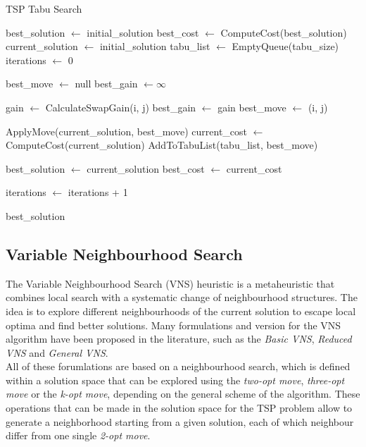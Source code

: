 \documentclass{article}
\begin{document}
\begin{algorithm}[!ht]
\caption{TSP Tabu Search}
\begin{algorithmic}[1]
\State best\_solution $\gets$ initial\_solution
\State best\_cost $\gets$ ComputeCost(best\_solution)
\State current\_solution $\gets$ initial\_solution
\State tabu\_list $\gets$ EmptyQueue(tabu\_size)
\State iterations $\gets$ 0

    \State best\_move $\gets$ null
    \State best\_gain $\gets \infty$
    
            \State gain $\gets$ CalculateSwapGain(i, j)
                \State best\_gain $\gets$ gain
                \State best\_move $\gets$ (i, j)
            \EndIf
        \EndIf
    \EndFor
    
    \State ApplyMove(current\_solution, best\_move)
    \State current\_cost $\gets$ ComputeCost(current\_solution)
    \State AddToTabuList(tabu\_list, best\_move)
    
        \State best\_solution $\gets$ current\_solution
        \State best\_cost $\gets$ current\_cost
    \EndIf
    
    \State iterations $\gets$ iterations + 1
\EndWhile

\State \Return best\_solution
\EndProcedure
\end{algorithmic}
\end{algorithm}

\newpage

\subsection{Variable Neighbourhood Search}
The Variable Neighbourhood Search (VNS) heuristic is a metaheuristic that combines local search with a systematic change of neighbourhood structures. 
The idea is to explore different neighbourhoods of the current solution to escape local optima and find better solutions.
Many formulations and version for the VNS algorithm have been proposed in the literature, such as the \textit{Basic VNS}, \textit{Reduced VNS} and \textit{General VNS}.\cite{VariableNeighborhood_Search}\\

All of these forumlations are based on a neighbourhood search, which is defined within a solution space that can be explored using the \textit{two-opt move}, 
\textit{three-opt move} or the \textit{k-opt move}, depending on the general scheme of the algorithm. These operations that can be made in the solution space for the TSP problem allow to generate a neighborhood
starting from a given solution, each of which neighbour differ from one single \textit{2-opt move}\cite{Heuristics_for_the_Traveling_Salesman_Problem}. 
\end{document}
